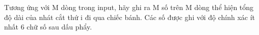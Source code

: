 Tương ứng với M dòng trong input, hãy ghi ra M số trên M dòng thể hiện tổng độ dài của nhát cắt thứ i đi qua chiếc bánh. Các số được ghi với độ chính xác ít nhất 6 chữ số sau dấu phẩy.
